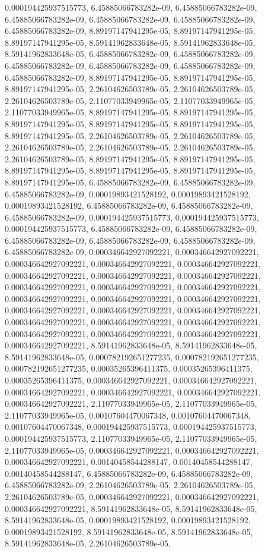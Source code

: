 \documentclass[
  ,man]{apa6}
\begin{document}
0.000194425937515773, 6.45885066783282e-09, 6.45885066783282e-09, 6.45885066783282e-09, 6.45885066783282e-09, 6.45885066783282e-09, 6.45885066783282e-09, 8.89197147941295e-05, 8.89197147941295e-05, 8.89197147941295e-05, 8.59141962833648e-05, 8.59141962833648e-05, 8.59141962833648e-05, 6.45885066783282e-09, 6.45885066783282e-09, 6.45885066783282e-09, 6.45885066783282e-09, 6.45885066783282e-09, 6.45885066783282e-09, 8.89197147941295e-05, 8.89197147941295e-05, 8.89197147941295e-05, 2.26104626503789e-05,
2.26104626503789e-05, 2.26104626503789e-05, 2.11077033949965e-05, 2.11077033949965e-05, 2.11077033949965e-05, 8.89197147941295e-05, 8.89197147941295e-05, 8.89197147941295e-05, 8.89197147941295e-05, 8.89197147941295e-05, 8.89197147941295e-05, 2.26104626503789e-05, 2.26104626503789e-05, 2.26104626503789e-05, 2.26104626503789e-05, 2.26104626503789e-05, 2.26104626503789e-05, 8.89197147941295e-05, 8.89197147941295e-05, 8.89197147941295e-05, 8.89197147941295e-05, 8.89197147941295e-05, 8.89197147941295e-05,
6.45885066783282e-09, 6.45885066783282e-09, 6.45885066783282e-09, 0.00019893421528192, 0.00019893421528192, 0.00019893421528192, 6.45885066783282e-09, 6.45885066783282e-09, 6.45885066783282e-09, 0.000194425937515773, 0.000194425937515773, 0.000194425937515773, 6.45885066783282e-09, 6.45885066783282e-09, 6.45885066783282e-09, 6.45885066783282e-09, 6.45885066783282e-09, 6.45885066783282e-09, 0.000346642927092221, 0.000346642927092221, 0.000346642927092221, 0.000346642927092221, 0.000346642927092221,
0.000346642927092221, 0.000346642927092221, 0.000346642927092221, 0.000346642927092221, 0.000346642927092221, 0.000346642927092221, 0.000346642927092221, 0.000346642927092221, 0.000346642927092221, 0.000346642927092221, 0.000346642927092221, 0.000346642927092221, 0.000346642927092221, 0.000346642927092221, 0.000346642927092221, 0.000346642927092221, 0.000346642927092221, 0.000346642927092221, 0.000346642927092221, 8.59141962833648e-05, 8.59141962833648e-05, 8.59141962833648e-05, 0.000782192651277235,
0.000782192651277235, 0.000782192651277235, 0.00035265396411375, 0.00035265396411375, 0.00035265396411375, 0.000346642927092221, 0.000346642927092221, 0.000346642927092221, 0.000346642927092221, 0.000346642927092221, 0.000346642927092221, 2.11077033949965e-05, 2.11077033949965e-05, 2.11077033949965e-05, 0.00107604470067348, 0.00107604470067348, 0.00107604470067348, 0.000194425937515773, 0.000194425937515773, 0.000194425937515773, 2.11077033949965e-05, 2.11077033949965e-05, 2.11077033949965e-05, 0.000346642927092221,
0.000346642927092221, 0.000346642927092221, 0.00140458544288147, 0.00140458544288147, 0.00140458544288147, 6.45885066783282e-09, 6.45885066783282e-09, 6.45885066783282e-09, 2.26104626503789e-05, 2.26104626503789e-05, 2.26104626503789e-05, 0.000346642927092221, 0.000346642927092221, 0.000346642927092221, 8.59141962833648e-05, 8.59141962833648e-05, 8.59141962833648e-05, 0.00019893421528192, 0.00019893421528192, 0.00019893421528192, 8.59141962833648e-05, 8.59141962833648e-05, 8.59141962833648e-05, 2.26104626503789e-05,
\end{document}
